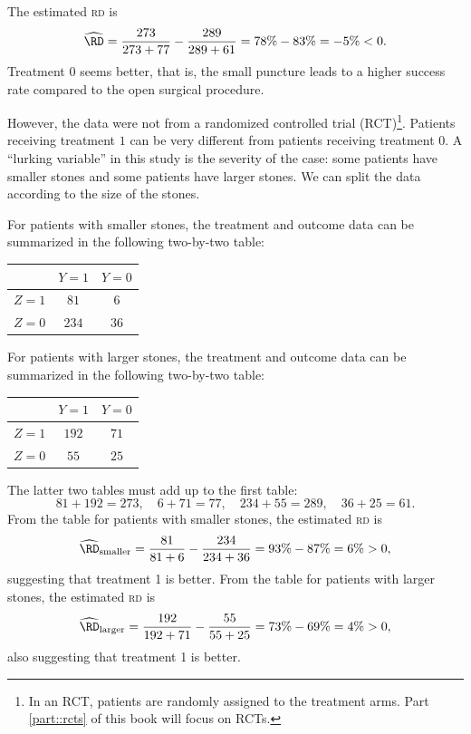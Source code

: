 The estimated \textsc{rd} is 
$$
\widehat{\RD} = \frac{273}{273 + 77} - \frac{289}{289 + 61} = 78\% - 83\% = -5\% <0. 
$$
Treatment 0 seems better, that is, the small puncture leads to a higher success rate compared to the open surgical procedure. 


However, the data were not from a randomized controlled trial (RCT)\footnote{In an RCT, patients are randomly assigned to the treatment arms. Part \ref{part::rcts} of this book will focus on RCTs.}. Patients receiving treatment $1$ can be very different from patients receiving treatment $0$. A ``lurking variable'' in this study is the severity of the case: some patients have smaller stones and some patients have larger stones. We can split the data according to the size of the stones. 


For patients with smaller stones, the treatment and outcome data can be summarized in the following two-by-two table: 
 \begin{center}
\begin{tabular}{lcc}
\hline 
        & $Y =1$ & $Y =0$\\\hline
$Z =1$ & $81$ & $6$\\ 
$Z =0$ & $234$ & $36$\\
\hline 
\end{tabular}
\end{center}
For patients with larger stones, the treatment and outcome data can be summarized in the following two-by-two  table:  
 \begin{center}
\begin{tabular}{lcc}
\hline 
        & $Y =1$ & $Y =0$\\\hline
$Z =1$ & $192$ & $71$\\ 
$Z =0$ & $55$ & $25$\\
\hline 
\end{tabular}
\end{center}


The latter two tables must add up to the first table:
$$
81 + 192 = 273,\quad 6 + 71 =77,\quad   234 + 55 = 289, \quad 36 + 25 = 61 .  
$$
From the table for patients with smaller stones, the estimated \textsc{rd} is
$$
\widehat{\RD}_\text{smaller} = \frac{81}{81 + 6} - \frac{234}{234 + 36} = 93\% - 87\% = 6\% > 0,
$$
suggesting that treatment 1 is better. From the table for patients with larger stones, the estimated \textsc{rd}  is 
$$
\widehat{\RD}_\text{larger} = \frac{192}{192 + 71} - \frac{55}{55+25} = 73\% - 69\% = 4\% > 0 ,
$$
also suggesting that treatment 1 is better. 


